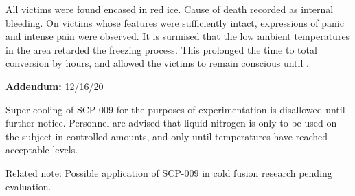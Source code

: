 All victims were found encased in red ice. Cause of death recorded as internal bleeding. On victims whose features were sufficiently intact, expressions of panic and intense pain were observed. It is surmised that the low ambient temperatures in the area retarded the freezing process. This prolonged the time to total conversion by  hours, and allowed the victims to remain conscious until \expunged.

\textbf{Addendum:} 12/16/20

Super-cooling of SCP-009 for the purposes of experimentation is disallowed until further notice. Personnel are advised that liquid nitrogen is only to be used on the subject in controlled amounts, and only until temperatures have reached acceptable levels.

Related note: Possible application of SCP-009 in cold fusion research pending evaluation.